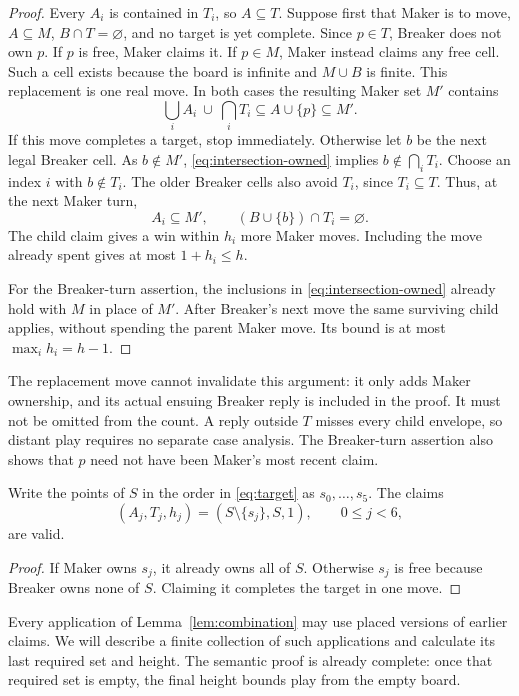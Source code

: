 \begin{proof}
Every $A_i$ is contained in $T_i$, so $A\subseteq T$.
Suppose first that Maker is to move, $A\subseteq M$,
$B\cap T=\varnothing$, and no target is yet complete.
Since $p\in T$, Breaker does not own $p$.
If $p$ is free, Maker claims it. If $p\in M$, Maker instead claims
any free cell. Such a cell exists because the board is infinite
and $M\cup B$ is finite. This replacement is one real move.
In both cases the resulting Maker set $M'$ contains
\begin{equation}\label{eq:intersection-owned}
 \bigcup_i A_i\ \cup\ \bigcap_iT_i
 \subseteq A\cup\{p\}\subseteq M'.
\end{equation}
If this move completes a target, stop immediately.
Otherwise let $b$ be the next legal Breaker cell. As $b\notin M'$,
\eqref{eq:intersection-owned} implies $b\notin\bigcap_iT_i$.
Choose an index $i$ with $b\notin T_i$.
The older Breaker cells also avoid $T_i$, since $T_i\subseteq T$.
Thus, at the next Maker turn,
\[
 A_i\subseteq M',\qquad (B\cup\{b\})\cap T_i=\varnothing.
\]
The child claim gives a win within $h_i$ more Maker moves.
Including the move already spent gives at most $1+h_i\le h$.

For the Breaker-turn assertion, the inclusions in
\eqref{eq:intersection-owned} already hold with $M$ in place of
$M'$. After Breaker's next move the same surviving child applies,
without spending the parent Maker move. Its bound is at most
$\max_i h_i=h-1$.
\end{proof}

The replacement move cannot invalidate this argument: it only adds
Maker ownership, and its actual ensuing Breaker reply is included
in the proof. It must not be omitted from the count.
A reply outside $T$ misses every child envelope, so distant play
requires no separate case analysis. The Breaker-turn assertion
also shows that $p$ need not have been Maker's most recent claim.

\begin{lemma}\label{lem:bases}
Write the points of $S$ in the order in \eqref{eq:target} as
$s_0,\ldots,s_5$. The claims
\begin{equation}\label{eq:bases}
 (A_j,T_j,h_j)=(S\setminus\{s_j\},S,1),
 \qquad 0\le j<6,
\end{equation}
are valid.
\end{lemma}

\begin{proof}
If Maker owns $s_j$, it already owns all of $S$.
Otherwise $s_j$ is free because Breaker owns none of $S$.
Claiming it completes the target in one move.
\end{proof}

Every application of Lemma~\ref{lem:combination} may use placed
versions of earlier claims. We will describe a finite collection of
such applications and calculate its last required set and height.
The semantic proof is already complete: once that required set is
empty, the final height bounds play from the empty board.
